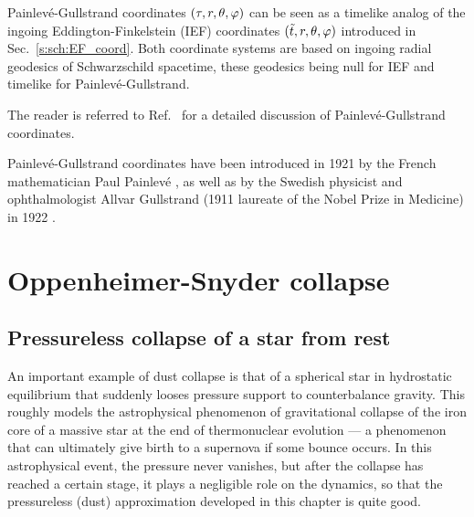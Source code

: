 \begin{remark}
Painlevé-Gullstrand coordinates $(\tau,r,\theta,\varphi)$ can be seen as a timelike analog of the
ingoing
Eddington-Finkelstein (IEF) coordinates $(\tilde{t},r,\theta,\varphi)$ introduced in Sec.~\ref{s:sch:EF_coord}. Both coordinate
systems are based on ingoing radial geodesics of Schwarzschild spacetime, these
geodesics being null for IEF and timelike for Painlevé-Gullstrand.
\end{remark}

The reader is referred to Ref.~\cite{MarteP01} for a detailed
discussion of Painlevé-Gullstrand coordinates.

\begin{hist}
Painlevé-Gullstrand coordinates have been introduced in 1921 by the
French mathematician
Paul Painlevé \cite{Painl1921}, as well as by the Swedish physicist and ophthalmologist
Allvar Gullstrand (1911 laureate of the Nobel Prize in Medicine) in 1922 \cite{Gulls1922}.
\end{hist}

\section{Oppenheimer-Snyder collapse} \label{s:lem:OS}

\subsection{Pressureless collapse of a star from rest}

An important example of dust collapse is that of
a spherical star in hydrostatic equilibrium that suddenly looses
pressure support to counterbalance gravity. This roughly models the astrophysical
phenomenon of gravitational collapse
of the iron core of a massive star at the
end of thermonuclear evolution --- a phenomenon that can ultimately give birth
to a supernova if some bounce occurs. In this astrophysical event, the
pressure never vanishes, but after the collapse has reached a certain stage, it
plays a negligible role on the dynamics, so that the pressureless (dust) approximation
developed in this chapter is quite good.

